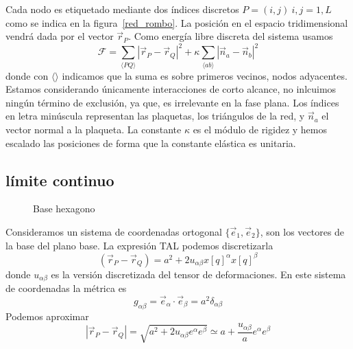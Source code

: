 Cada nodo es etiquetado mediante dos índices discretos $P=(i,j)\ i,j=1,L$
como se indica en la figura~\ref{red_rombo}. La posición en el espacio
tridimensional vendrá dada por el vector $\vec{r}_P$. Como energía libre discreta del sistema usamos
\begin{equation}
\mathcal{F}=\sum_{\langle PQ \rangle}
|\vec{r}_P-\vec{r}_Q|^2+\kappa\sum_{\langle ab \rangle}
|\vec{n}_a-\vec{n}_b|^2 
\end{equation}
donde con $\langle\rangle$ indicamos que la suma es sobre primeros vecinos,
nodos adyacentes. Estamos considerando únicamente interacciones de corto
alcance,  no inlcuimos ningún término de exclusión, ya que, es irrelevante en
la fase plana. Los  índices en letra minúscula representan las plaquetas, 
los triángulos de la red, y $\vec{n}_{a}$ el vector normal a la plaqueta. La
constante $\kappa$ es el módulo de rigidez y hemos escalado las posiciones de
forma que la constante elástica es unitaria.


\subsection{límite continuo}
\begin{figure}[h]
\centering
 \resizebox{\columnwidth}{!}{}
\caption{Base hexagono}
\end{figure}   
Consideramos un sistema de coordenadas ortogonal $\{ \vec{e}_1,\vec{e}_2\}$, son los vectores de la base del plano base. La expresión TAL podemos discretizarla
\begin{equation}
(\vec{r}_P-\vec{r}_Q)=a^2+2u_{\alpha\beta}x{\scriptstyle [q]}^{\alpha}x{\scriptstyle [q]}^{\beta}
\end{equation}
donde $u_{\alpha\beta}$ es la versión discretizada del tensor de
deformaciones. En este  sistema de coordenadas la métrica es
\begin{equation}
g_{\alpha\beta}=\vec{e}_{\alpha}\cdot\vec{e}_{\beta}=a^2\delta_{\alpha\beta}
\end{equation}
Podemos aproximar
\begin{equation}
|\vec{r}_P-\vec{r}_Q|=\sqrt{a^2+2u_{\alpha\beta}e^{\alpha}e^{\beta}}\simeq a + \frac{u_{\alpha\beta}}{a}e^{\alpha}e^{\beta}
\end{equation}



